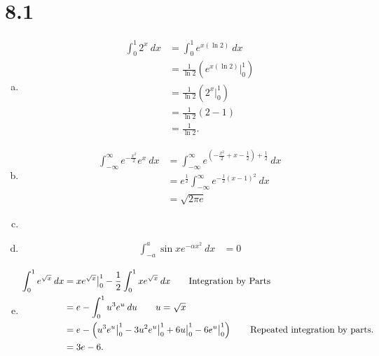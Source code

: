 \documentclass[10pt]{mypackage}
\begin{document}
\RaggedRight
\section{8.1}%
\begin{enumerate}[(a)]
  \item 
    \begin{align*}
      \int_{0}^{1} 2^x\:dx &= \int_{0}^{1} e^{x\left(\ln 2\right)}\:dx\\
                           &= \frac{1}{\ln 2}\left(e^{x\left(\ln 2\right)}\bigr\vert_{0}^{1}\right)\tag*{$u = x\left(\ln 2\right)$}\\
                           &= \frac{1}{\ln 2}\left(2^{x}\bigr\vert_{0}^{1}\right)\\
                           &= \frac{1}{\ln 2}\left(2-1\right)\\
                           &= \frac{1}{\ln 2}.
    \end{align*}
  \item
    \begin{align*}
      \int_{-\infty}^{\infty} e^{-\frac{x^2}{2}}e^{x}\:dx &= \int_{-\infty}^{\infty} e^{\left(-\frac{x^2}{2} + x - \frac{1}{2} \right)+ \frac{1}{2}}\:dx\tag*{Completing the square.}\\
                                                          &= e^{\frac{1}{2}}\int_{-\infty}^{\infty}e^{-\frac{1}{2}\left(x-1\right)^2} \:dx\\
                                                          &= \sqrt{2\pi e}\tag*{Gaussian Integral}
    \end{align*}
  \item 
  \item 
    \begin{align*}
      \int_{-a}^{a} \sin x e^{-\alpha x^2}\:dx &= 0 \tag*{Even/odd.}
    \end{align*}
  \item 
    \begin{align*}
      \int_{0}^{1} e^{\sqrt{x}}\:dx &= xe^{\sqrt{x}}\bigr\vert_{0}^{1} - \frac{1}{2}\int_{0}^{1} xe^{\sqrt{x}}\:dx\tag*{Integration by Parts}\\
                                    &= e - \int_{0}^{1} u^3e^{u}\:du\tag*{$u = \sqrt{x}$}\\
                                    &= e - \left(u^3e^{u}\bigr\vert_{0}^{1} - 3u^2e^{u}\bigr\vert_{0}^{1} + 6u\bigr\vert_{0}^{1} - 6e^{u}\bigr\vert_{0}^{1}\right)\tag*{Repeated integration by parts.}\\
                                    &= 3e-6.

\end{align*}
\end{enumerate}
\end{document}
